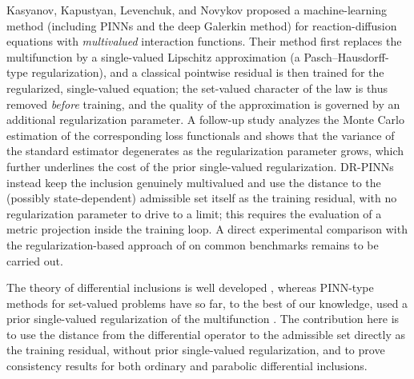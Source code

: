 \documentclass[11pt]{elsarticle}
\theoremstyle{definition}
\theoremstyle{remark}
\numberwithin{equation}{section}
\begin{document}
	Kasyanov, Kapustyan, Levenchuk, and Novykov \cite{kasyanov2024}
	proposed a machine-learning method (including PINNs and the deep Galerkin
	method) for reacti\-on-diffusion equations with \emph{multivalued}
	interaction functions. Their method first replaces the multifunction by a
	single-valued Lipschitz approximation (a
	Pasch--Hausdorff-type regularization), and a classical pointwise
	residual is then trained for the regularized, single-valued equation;
	the set-valued character of the law is thus removed \emph{before}
	training, and the quality of the approximation is governed by an
	additional regularization parameter. A follow-up study
	\cite{paliichuk2026} analyzes the Monte Carlo estimation of the
	corresponding loss functionals and shows that the variance of the
	standard estimator degenerates as the regularization parameter grows,
	which further underlines the cost of the prior single-valued
	regularization. DR-PINNs instead keep the inclusion genuinely
	multivalued and use the distance to the (possibly state-dependent)
	admissible set itself as the training residual, with no regularization
	parameter to drive to a limit; this requires the evaluation of a
	metric projection inside the training loop. A direct experimental comparison with the regularization-based approach of
	\cite{kasyanov2024} on common benchmarks remains to be carried out.
	
	The theory of differential inclusions is well developed
	\cite{aubin_cellina_1984,aubin_frankowska_2009,deimling_1992}, whereas
	PINN-type methods for set-valued problems have so far, to the best of our
	knowledge, used a prior single-valued regularization of the multifunction
	\cite{kasyanov2024,paliichuk2026}. The contribution here is to use the
	distance from the differential operator to the admissible set directly as
	the training residual, without prior single-valued regularization, and to
	prove consistency results for both ordinary and parabolic differential
	inclusions.
	
	\vspace{0.3cm}
	
\end{document}
